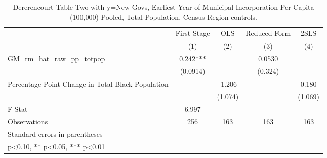 \begin{table}[htbp]\centering
\def\sym#1{\ifmmode^{#1}\else\(^{#1}\)\fi}
\caption{Dererencourt Table Two with y=New Govs, Earliest Year of Municipal Incorporation Per Capita (100,000) Pooled, Total Population, Census Region controls.}
\begin{tabular}{l*{4}{c}}
\toprule
                    & First Stage   &         OLS   &Reduced Form   &        2SLS   \\
                    &\multicolumn{1}{c}{(1)}   &\multicolumn{1}{c}{(2)}   &\multicolumn{1}{c}{(3)}   &\multicolumn{1}{c}{(4)}   \\
\midrule
GM\_rm\_hat\_raw\_pp\_totpop&       0.242***&               &      0.0530   &               \\
                    &    (0.0914)   &               &     (0.324)   &               \\
\addlinespace
Percentage Point Change in Total Black Population&               &      -1.206   &               &       0.180   \\
                    &               &     (1.074)   &               &     (1.069)   \\
\midrule
F-Stat              &       6.997   &               &               &               \\
Observations        &         256   &         163   &         163   &         163   \\
\bottomrule
\multicolumn{5}{l}{\footnotesize Standard errors in parentheses}\\
\multicolumn{5}{l}{\footnotesize * p<0.10, ** p<0.05, *** p<0.01}\\
\end{tabular}
\end{table}
